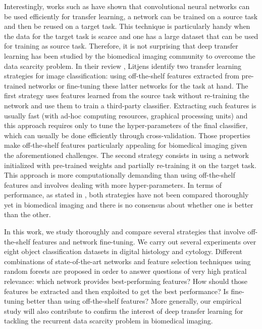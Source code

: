 Interestingly, works such as \parencite{donahue2014decaf,yosinski2014transferable,sermanet2013overfeat} have shown that convolutional neural networks can be used efficiently for transfer learning, \ie a network can be trained on a source task and then be reused on a target task. This technique is particularly handy when the data for the target task is scarce and one has a large dataset that can be used for training as source task. Therefore, it is not surprising that deep transfer learning has been studied by the biomedical imaging community to overcome the data scarcity problem. In their review \parencite{litjens2017survey}, Litjens \etal identify two transfer learning strategies for image classification: using off-the-shelf features extracted from pre-trained networks or fine-tuning these latter networks for the task at hand. The first strategy uses features learned from the source task without re-training the network and use them to train a third-party classifier. Extracting such features is usually fast (with ad-hoc computing resources, \ie graphical processing units) and this approach requires only to tune the hyper-parameters of the final classifier, which can usually be done efficiently through cross-validation. Those properties make off-the-shelf features particularly appealing for biomedical imaging given the aforementioned challenges. The second strategy consists in using a network initialized with pre-trained weights and partially re-training it on the target task. This approach is more computationally demanding than using off-the-shelf features and involves dealing with more hyper-parameters. In terms of performance, as stated in \parencite{litjens2017survey}, both strategies have not been compared thoroughly yet in biomedical imaging and there is no consensus about whether one is better than the other.

In this work, we study thoroughly and compare several strategies that involve off-the-shelf features and network fine-tuning. We carry out several experiments over eight object classification datasets in digital histology and cytology. Different combinations of state-of-the-art networks and feature selection techniques using random forests are proposed in order to answer questions of very high pratical relevance: which network provides best-performing features? How should those features be extracted and then exploited to get the best performance? Is fine-tuning better than using off-the-shelf features? More generally, our empirical study will also contribute to confirm the interest of deep transfer learning for tackling the recurrent data scarcity problem in biomedical imaging.





